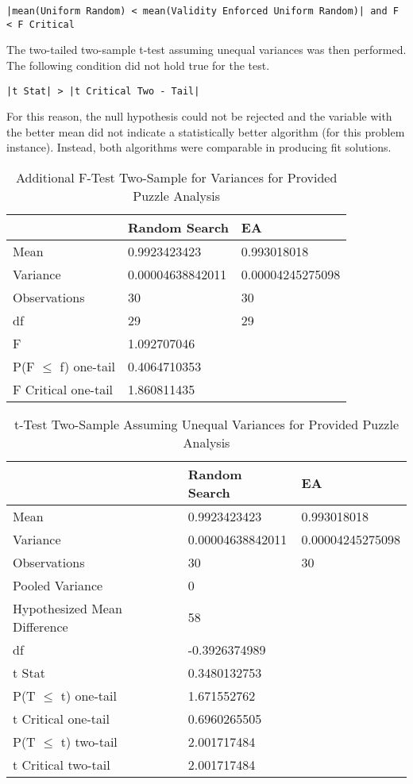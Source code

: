 \documentclass[11pt]{article}
\begin{document}
\begin{center}
\texttt{|mean(Uniform Random) < mean(Validity Enforced Uniform Random)| and F < F Critical}
\end{center}

The two-tailed two-sample t-test assuming unequal variances was then performed. The following condition did not hold true for the test.

\begin{center}
\texttt{|t Stat| > |t Critical Two - Tail|}
\end{center}

For this reason, the null hypothesis could not be rejected and the variable with the better mean did not indicate a statistically better algorithm (for this problem instance). Instead, both algorithms were comparable in producing fit solutions.



\begin{table}[H]
\centering
\caption{Additional F-Test Two-Sample for Variances for Provided Puzzle Analysis}
\label{my-label}
\begin{tabular}{l|l|l}
 & Random Search & EA \\ \hline
Mean & 0.9923423423 & 0.993018018 \\
Variance & 0.00004638842011 & 0.00004245275098 \\
Observations & 30 & 30 \\
df & 29 & 29 \\
F & 1.092707046 &  \\
P(F $\leq$ f) one-tail & 0.4064710353 &  \\
F Critical one-tail & 1.860811435 & 
\end{tabular}
\end{table}

\begin{table}[H]
\centering
\caption{t-Test Two-Sample Assuming Unequal Variances for Provided Puzzle Analysis}
\label{my-label}
\begin{tabular}{l|l|l}
 & Random Search & EA \\ \hline
Mean & 0.9923423423 & 0.993018018 \\
Variance & 0.00004638842011 & 0.00004245275098 \\
Observations & 30 & 30 \\
Pooled Variance & 0 &  \\
Hypothesized Mean Difference & 58 &  \\
df & -0.3926374989 &  \\
t Stat & 0.3480132753 &  \\
P(T $\leq$ t) one-tail & 1.671552762 &  \\
t Critical one-tail & 0.6960265505 &  \\
P(T $\leq$ t) two-tail & 2.001717484 &  \\
t Critical two-tail & 2.001717484 & 
\end{tabular}
\end{table}
\end{document}
